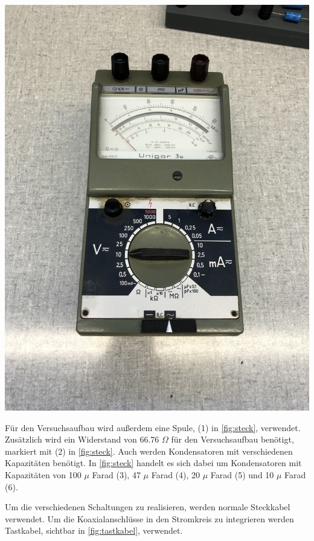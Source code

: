 \documentclass[11pt,ngerman]{scrartcl}
\begin{document}
\begin{minipage}{\textwidth}
\begin{minipage}[t]{0.5\textwidth}
		\includegraphics[angle=270,width=\textwidth]{multi_alt}
		\label{fig:multi_alt}
	\end{minipage}
	\vspace{1em}
\end{minipage}

Für den Versuchsaufbau wird außerdem eine Spule, (1) in \autoref{fig:steck}, verwendet. Zusätzlich wird ein Widerstand von 66.76 $\Omega$ für den Versuchsaufbau benötigt, markiert mit (2) in \autoref{fig:steck}. Auch werden Kondensatoren mit verschiedenen Kapazitäten benötigt. In \autoref{fig:steck} handelt es sich dabei um Kondensatoren mit Kapazitäten von 100 $\mu$ Farad (3), 47 $\mu$ Farad (4), 20 $\mu$ Farad (5) und 10 $\mu$ Farad (6).

Um die verschiedenen Schaltungen zu realisieren, werden normale Steckkabel verwendet. Um die Koaxialanschlüsse in den Stromkreis zu integrieren werden Tastkabel, sichtbar in \autoref{fig:tastkabel}, verwendet.
\end{document}
